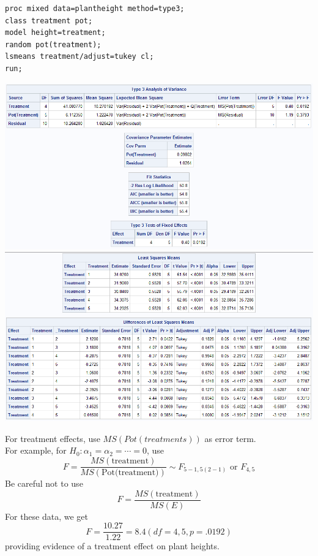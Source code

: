 \begin{small}
\begin{verbatim}
proc mixed data=plantheight method=type3;
class treatment pot;
model height=treatment;
random pot(treatment);
lsmeans treatment/adjust=tukey cl;
run;
\end{verbatim}
\end{small}

\begin{center}
\includegraphics[scale=0.7]{Heights}\\
\includegraphics[scale=0.7]{Heights2}
\end{center}

\newpage

For treatment effects, use $MS(Pot(treatments))$ as error term.  \\
For example, for $H_0: \alpha_1=\alpha_2=\cdots=0$, use
$$ F = \frac{MS(\mbox{treatment})}{MS(\mbox{Pot(treatment)})} \sim F_{5-1,5(2-1)} \mbox{ or }F_{4,5}$$
Be careful not to use
$$ F = \frac{MS(\mbox{treatment})}{MS(E)}$$
For these data, we get
$$ F=\frac{10.27}{1.22}=8.4 (df=4,5, p=.0192)$$
providing evidence of a treatment effect on plant heights.
